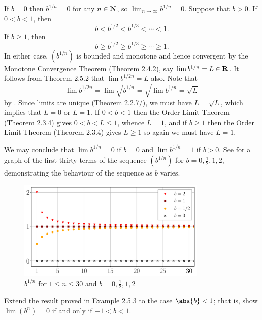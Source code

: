 \documentclass{lew98_solutions}
\begin{document}
\begin{solution}
    If \( b = 0 \) then \( b^{1/n} = 0 \) for any \( n \in \mathbf{N} \), so \( \lim_{n \to \infty} b^{1/n} = 0 \). Suppose that \( b > 0 \). If \( 0 < b < 1 \), then
    \[
        b < b^{1/2} < b^{1/3} < \cdots < 1.
    \]
    If \( b \geq 1 \), then
    \[
        b \geq b^{1/2} \geq b^{1/3} \geq \cdots \geq 1.
    \]
    In either case, \( (b^{1/n}) \) is bounded and monotone and hence convergent by the Monotone Convergence Theorem (Theorem 2.4.2), say \( \lim b^{1/n} = L \in \mathbf{R} \). It follows from Theorem 2.5.2 that \( \lim b^{1/2n} = L \) also. Note that
    \[
        \lim b^{1/2n} = \lim \sqrt{b^{1/n}} = \sqrt{\lim b^{1/n}} = \sqrt{L}
    \]
    by . Since limits are unique (Theorem 2.2.7/), we must have \( L = \sqrt{L} \), which implies that \( L = 0 \) or \( L = 1 \). If \( 0 < b < 1 \) then the Order Limit Theorem (Theorem 2.3.4) gives \( 0 < b < L \leq 1 \), whence \( L = 1 \), and if \( b \geq 1 \) then the Order Limit Theorem (Theorem 2.3.4) gives \( L \geq 1 \) so again we must have \( L = 1 \).

    We may conclude that \( \lim b^{1/n} = 0 \) if \( b = 0 \) and \( \lim b^{1/n} = 1 \) if \( b > 0 \). See  for a graph of the first thirty terms of the sequence \( (b^{1/n}) \) for \( b = 0, \tfrac{1}{2}, 1, 2 \), demonstrating the behaviour of the sequence as \( b \) varies.
    \begin{figure}[H]
        \centering
        \includegraphics[width=0.8\textwidth]{UA_Figures/UA_ex2_5_6_fig.pdf}
        \caption{\( b^{1/n} \) for \( 1 \leq n \leq 30 \) and \( b = 0, \tfrac{1}{2}, 1, 2 \)}
        \label{fig:ex2.5.6}
    \end{figure}
\end{solution}

\begin{exercise}
\label{ex:2.5.7}
    Extend the result proved in Example 2.5.3 to the case \( \abs{b} < 1 \); that is, show \( \lim (b^n) = 0 \) if and only if \( -1 < b < 1 \).
\end{exercise}
\end{document}
